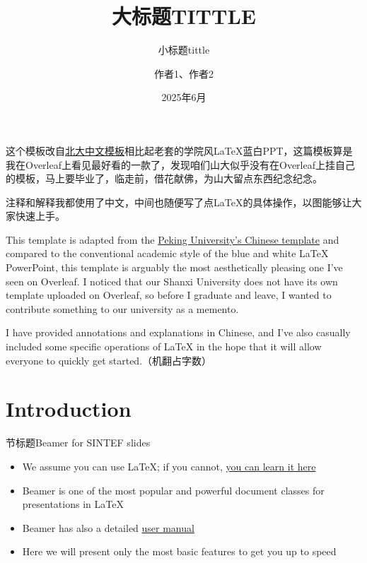 \documentclass{beamer}%
\title{大标题TITTLE}%
\subtitle{小标题tittle}
\author{作者1、作者2}
\date{2025年6月}
\newcommand{\hrefcol}[2]{\textcolor{maincolor!80}{\href{#1}{#2}}}%
\begin{document}

\maketitle%

\begin{frame}
\quad 这个模板改自\hrefcol{https://www.overleaf.com/project/661d34c6f64d615adf68f215}{北大中文模板}相比起老套的学院风\LaTeX 蓝白PPT，这篇模板算是我在Overleaf上看见最好看的一款了，发现咱们山大似乎没有在Overleaf上挂自己的模板，马上要毕业了，临走前，借花献佛，为山大留点东西纪念纪念。
\vspace{\baselineskip}%

\quad 注释和解释我都使用了中文，中间也随便写了点\LaTeX 的具体操作，以图能够让大家快速上手。
\end{frame}

\begin{frame}
\quad This template is adapted from the \hrefcol{https://www.overleaf.com/project/661d34c6f64d615adf68f215}{Peking University's Chinese template} and compared to the conventional academic style of the blue and white LaTeX PowerPoint, this template is arguably the most aesthetically pleasing one I've seen on Overleaf. I noticed that our Shanxi University does not have its own template uploaded on Overleaf, so before I graduate and leave, I wanted to contribute something to our university as a memento.

\vspace{\baselineskip}

I have provided annotations and explanations in Chinese, and I've also casually included some specific operations of LaTeX in the hope that it will allow everyone to quickly get started.（机翻占字数）
\end{frame}




\section{Introduction}

\begin{frame}{节标题Beamer for SINTEF slides}
\begin{itemize}
\item We assume you can use \LaTeX; if you cannot,
\hrefcol{http://en.wikibooks.org/wiki/LaTeX/}{you can learn it here}
\item Beamer is one of the most popular and powerful document
classes for presentations in \LaTeX
\item Beamer has also a detailed
\hrefcol{http://www.ctan.org/tex-archive/macros/latex/contrib/beamer/doc/beameruserguide.pdf}{user
 manual}
\item Here we will present only the most basic features to get you up to speed
\end{itemize}
\end{frame}
\end{document}
